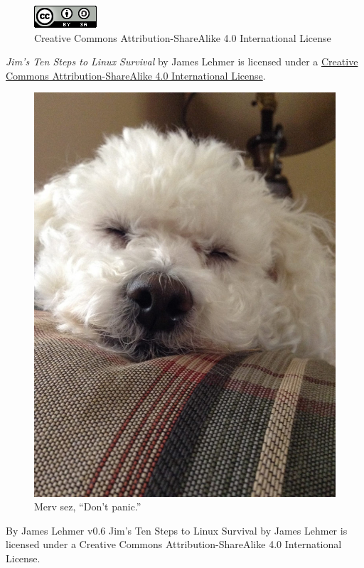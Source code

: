 \documentclass[10pt,]{book}
\numberwithin{figure}{chapter}
\begin{document}
\begin{figure}[H]
\centering
\includegraphics{./images/cc-by-sa.png}
\caption*{Creative Commons Attribution-ShareAlike 4.0 International License}
\end{figure}

\emph{Jim's Ten Steps to Linux Survival} by James Lehmer is licensed
under a \href{http://creativecommons.org/licenses/by-sa/4.0/}{Creative
Commons Attribution-ShareAlike 4.0 International License}.
\pagestyle{headings} \else

\begin{figure}[htbp]
\centering
\includegraphics{./images/Merv.jpg}
\caption{Merv sez, ``Don't panic.''}
\end{figure}

By James Lehmer v0.6 {Jim's Ten Steps to Linux Survival} by {James
Lehmer} is licensed under a Creative Commons Attribution-ShareAlike 4.0
International License.
\end{document}
